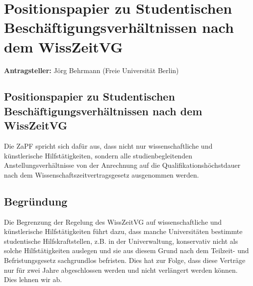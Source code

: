 \documentclass[draft,12pt,oneside]{scrartcl}
\begin{document}
\section*{Positionspapier zu Studentischen Beschäftigungsverhältnissen nach dem WissZeitVG}

\textbf{Antragsteller:} Jörg Behrmann (Freie Universität Berlin)

\subsection*{Positionspapier zu Studentischen Beschäftigungsverhältnissen nach dem WissZeitVG}

Die ZaPF spricht sich dafür aus, dass nicht nur wissenschaftliche und
künstlerische Hilfstätigkeiten, sondern alle studienbegleitenden
Anstellungsverhältnisse von der Anrechnung auf die Qualifikationshöchstdauer
nach dem Wissenschaftszeitvertragsgesetz ausgenommen werden.

\subsection*{Begründung}

Die Begrenzung der Regelung des WissZeitVG auf wissenschaftliche und
künstlerische Hilfstätigkeiten führt dazu, dass manche Universitäten bestimmte
studentische Hilfskraftstellen, z.B. in der Univerwaltung, konservativ nicht als
solche Hilfstätigkeiten auslegen und sie aus diesem Grund nach dem Teilzeit- und
Befristungsgesetz sachgrundlos befristen. Dies hat zur Folge, dass diese
Verträge nur für zwei Jahre abgeschlossen werden und nicht verlängert werden
können. Dies lehnen wir ab.
\end{document}
